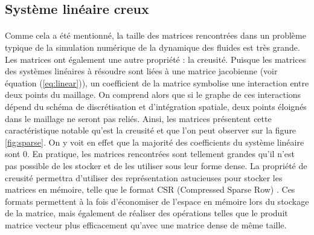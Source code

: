 	\subsection{Système linéaire creux}

		\paragraph{}
		Comme cela a été mentionné, la taille des matrices rencontrées dans un problème typique de la simulation numérique de la dynamique des fluides est très grande.
		Les matrices ont également une autre propriété : la creusité.
		Puisque les matrices des systèmes linéaires à résoudre sont liées à une matrice jacobienne (voir équation (\ref{eq:linear})), un coefficient de la matrice symbolise une interaction entre deux points du maillage.
		On comprend alors que si le graphe de ces interactions dépend du schéma de discrétisation et d'intégration spatiale, deux points éloignés dans le maillage ne seront pas reliés.
		Ainsi, les matrices présentent cette caractéristique notable qu'est la creusité et que l'on peut observer sur la figure \ref{fig:sparse}.
		On y voit en effet que la majorité des coefficients du système linéaire sont 0.
		En pratique, les matrices rencontrées sont tellement grandes qu'il n'est pas possible de les stocker et de les utiliser sous leur forme dense.
		La propriété de creusité permettra d'utiliser des représentation astucieuses pour stocker les matrices en mémoire, telle que le format CSR (Compressed Sparse Row) \cite{Saad2003}.
		Ces formats permettent à la fois d'économiser de l'espace en mémoire lors du stockage de la matrice, mais également de réaliser des opérations telles que le produit matrice vecteur plus efficacement qu'avec une matrice dense de même taille.

